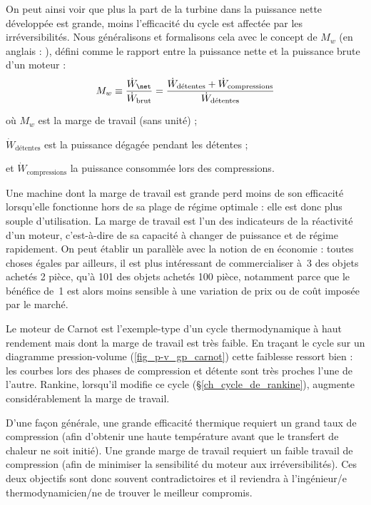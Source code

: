 		On peut ainsi voir que plus la part de la turbine dans la puissance nette développée est grande, moins l’efficacité du cycle est affectée par les irréversibilités. Nous généralisons et formalisons cela avec le concept de  $M_w$ (en anglais : ), défini comme le rapport entre la puissance nette et la puissance brute d’un moteur :
		\begin{equation}
			M_w \equiv 	\frac{\dot W_\net}{\dot W_\text{brut}}	= \frac{\dot W_\text{détentes} + \dot W_\text{compressions}}{\dot W_\text{détentes}}
			\label{eq_marge_travail}
		\end{equation}
		\begin{equationterms}
			\item où \tab $M_w$ 									\tab\tab\tab\tab\tab\tab\tab\tab est la marge de travail (sans unité) ;
			\item \tab $\dot W_\text{détentes}$ 			\tab\tab\tab\tab est la puissance dégagée pendant les détentes ;
			\item et \tab $\dot W_\text{compressions}$ 	\tab la puissance consommée lors des compressions.
		\end{equationterms}

		Une machine dont la marge de travail est grande perd moins de son efficacité lorsqu’elle fonctionne hors de sa plage de régime optimale : elle est donc plus souple d’utilisation. La marge de travail est l’un des indicateurs de la réactivité d’un moteur, c’est-à-dire de sa capacité à changer de puissance et de régime rapidement. On peut établir un parallèle avec la notion de  en économie : toutes choses égales par ailleurs, il est plus intéressant de commercialiser à~\SI{3}{\euroo} des objets achetés \SI{2}{\euroo} pièce, qu’à \SI{101}{\euroo} des objets achetés \SI{100}{\euroo} pièce, notamment parce que le bénéfice de~\SI{1}{\euroo} est alors moins sensible à une variation de prix ou de coût imposée par le marché.
		
			Le moteur de Carnot est l’exemple-type d’un cycle thermodynamique à haut rendement mais dont la marge de travail est très faible. En traçant le cycle sur un diagramme pression-volume (\cref{fig_p-v_gp_carnot}) cette faiblesse ressort bien : les courbes lors des phases de compression et détente sont très proches l’une de l’autre. Rankine, lorsqu’il modifie ce cycle (\S\ref{ch_cycle_de_rankine}), augmente considérablement la marge de travail.

		D’une façon générale, une grande efficacité thermique requiert un grand taux de compression (afin d’obtenir une haute température avant que le transfert de chaleur ne soit initié). Une grande marge de travail requiert un faible travail de compression (afin de minimiser la sensibilité du moteur aux irréversibilités). Ces deux objectifs sont donc souvent contradictoires et il reviendra à l’ingénieur/e thermodynamicien/ne de trouver le meilleur compromis.
		

